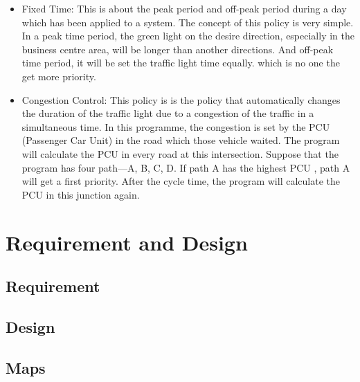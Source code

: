 \documentclass[11pt]{article}
\begin{document}
\begin{itemize}
		  		\begin{itemize}
			\item{} Fixed Time: This is about the peak period and off-peak period during a day which has been applied to a system. The concept of this policy is very simple. In a peak time period, the green light on the desire direction, especially in the business centre area, will be longer than another directions.  And off-peak time period, it will be set the traffic light time equally. which is no one the get more priority.   
			\item{} Congestion Control: This policy is is the policy that automatically changes the duration of the traffic light due to a congestion of the traffic in a simultaneous time. In this programme, the congestion is set by the PCU (Passenger Car Unit) in the road which those vehicle waited. The program will calculate the PCU in every road at this intersection. Suppose that the program has four path—A, B, C, D. If path A has the highest PCU , path A will get a first priority. After the cycle time, the program will calculate the PCU in this junction again.
			
  		\end{itemize}	
 		
  	\end{itemize}	


\newpage	
\section{Requirement and Design}
\subsection{Requirement}
\subsection{Design}
\subsection{Maps}
\end{document}
